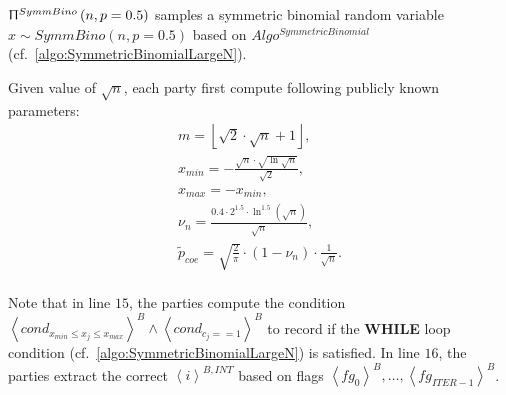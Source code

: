$\Uppi^{SymmBino}\left(n,p=0.5\right) $ samples a symmetric binomial random variable $x\sim SymmBino\left(n,p=0.5\right) $ based on $Algo^{SymmetricBinomial}$ (cf.~\autoref{algo:SymmetricBinomialLargeN}).


      Given value of $\sqrt{n}$, each party first compute following publicly known parameters:
      \begin{equation}
            \begin{split}
                  m = \left\lfloor \sqrt{2}\cdot\sqrt{n}+1\right\rfloor ,\\
                  x_{min}=-\frac{\sqrt{n}\cdot \sqrt{\ln{\sqrt {n}}}}{\sqrt{2}},\\
                  x_{max}=-x_{min},\\
                  \nu_{n}=\frac{0.4\cdot2^{1.5}\cdot \ln ^{1.5}(\sqrt{n})}{\sqrt{n}},\\
                  \tilde{p}_{coe}=\sqrt{\frac{2}{\pi }} \cdot \left(1-\nu_{n}\right)\cdot \frac{1}{\sqrt{n}} .\\
            \end{split}
      \end{equation}

      Note that in line $15$, the parties compute the condition $\left\langle cond_{x_{min} \leq x_j \leq x_{max}}\right\rangle ^B\land \left\langle cond_{c_j==1}\right\rangle ^B$ to record if the \textbf{WHILE} loop condition (cf.~\autoref{algo:SymmetricBinomialLargeN}) is satisfied.
      In line $16$, the parties extract the correct $\left\langle {i}\right\rangle ^{B,INT} $ based on flags $\left\langle fg_0\right\rangle^{B},\ldots, \left\langle fg_{ITER-1}\right\rangle^{B}$.

